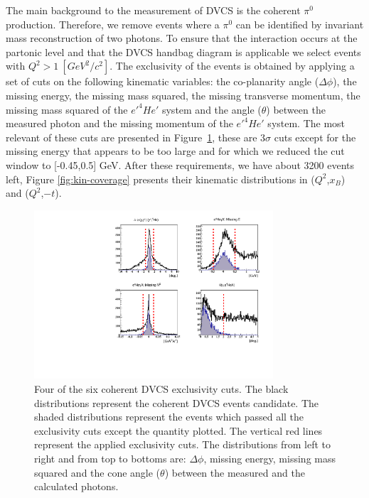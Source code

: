 \documentclass[nofootinbib,twocolumn,showpacs,prl,superscriptaddress,secnumarabic,amssymb,nobibnotes,aps,floatfix,preprint]{revtex4}
\begin{document}
The main background to the measurement of DVCS is the coherent $\pi^{0}$ 
production. Therefore, we remove events where a $\pi^{0}$ can be identified by 
invariant mass reconstruction of two photons.  To ensure that the interaction 
occurs at the partonic level and that the DVCS handbag diagram is applicable we 
select events with $Q^{2}>1~[GeV^{2}/c^{2}]$. The exclusivity of the events is 
obtained by applying a set of cuts on the following kinematic variables: the 
co-planarity angle ($\Delta \phi$), the missing energy, the missing mass 
squared, the missing transverse momentum, the missing mass squared of the 
$e'^4He'$ system and the angle ($\theta$) between the measured photon and the 
missing momentum of the $e'^4He'$ system. The most relevant of these cuts are 
presented in Figure~\ref{fig:kin-cuts}, these are 3$\sigma$ cuts except for the 
missing energy that appears to be too large and for which we reduced the cut 
window to [-0.45,0.5] GeV. After these requirements, we have about 3200 events 
left, Figure \ref{fig:kin-coverage} presents their
kinematic distributions in ($Q^{2}$,$x_{B}$) and ($Q^{2}$,$-t$).

\begin{figure}[tb]
\includegraphics[width=8.9cm]{figs/coh_exc_cuts.pdf}
\caption{Four of the six coherent DVCS exclusivity cuts. The black 
distributions represent the coherent DVCS events candidate. The shaded 
distributions represent the events which passed all the exclusivity cuts except 
the quantity plotted. The vertical red lines represent the applied exclusivity 
cuts. The distributions from left to right and from top to bottoms are: $\Delta 
\phi$, missing energy, missing mass squared and the cone angle ($\theta$) 
between the measured and the calculated photons.}
\label{fig:kin-cuts}
\end{figure}
 
\end{document}
